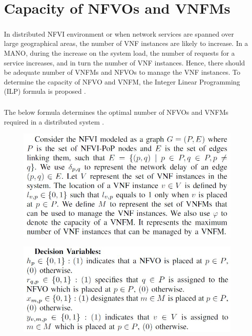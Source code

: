 \chapter{Capacity of NFVOs and VNFMs}
\label{ch:Capacity of NFVOs and VNFMs}

\paragraph{}In distributed NFVI environment or when network services are spanned over large geographical areas, the number of VNF instances are likely to increase. In a MANO, during the increase on the system load, the number of requests for a service increases, and in turn the number of VNF instances. Hence, there should be adequate number of VNFMs and NFVOs to manage the VNF instances. To determine the capacity of NFVO and VNFM, the Integer Linear Programming (ILP) formula is proposed \cite{abu2017nfv}.

\paragraph{}The below formula determines the optimal number of NFVOs and VNFMs required in a distributed system \cite{abu2017nfv}.



\begin{figure} [H]
	\centering
	\includegraphics[width=0.7\linewidth]{"figures/system model"}
	{\caption*{}}
	\label{}
\end{figure}

\begin{figure}[H]
	\centering
	\includegraphics[width=0.7\linewidth]{"figures/Decision variables"}
	{\caption*{}}
	\label{}
\end{figure}


